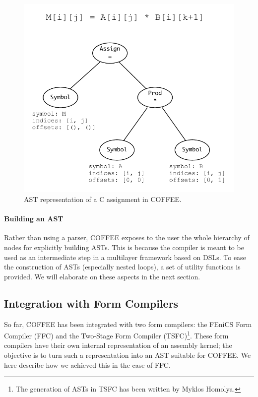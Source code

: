 \begin{figure}
\begin{center}
\includegraphics[scale=0.50]{coffee/pictures/coffee-ast.pdf}
\caption{AST representation of a C assignment in COFFEE.}
\label{fig:coffee-ast-vs-c}
\end{center}
\end{figure}

\paragraph{Building an AST}
Rather than using a parser, COFFEE exposes to the user the whole hierarchy of nodes for explicitly building ASTs. This is because the compiler is meant to be used as an intermediate step in a multilayer framework based on DSLs. To ease the construction of ASTs (especially nested loops), a set of utility functions is provided. We will elaborate on these aspects in the next section.

\subsection{Integration with Form Compilers}
So far, COFFEE has been integrated with two form compilers: the FEniCS Form Compiler (FFC) and the Two-Stage Form Compiler (TSFC)\footnote{The generation of ASTs in TSFC has been written by Myklos Homolya.}. These form compilers have their own internal representation of an assembly kernel; the objective is to turn such a representation into an AST suitable for COFFEE. We here describe how we achieved this in the case of FFC.


